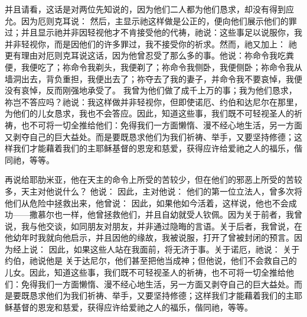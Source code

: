 并且请看，这话是对两位先知说的，因为他们二人都为他们恳求，却没有得到应允。因为厄则克耳说： 然后，主显示祂这样做是公正的，便向他们展示他们的罪过；并且显示祂并非因轻视他才不肯接受他的代祷，祂说：这些事足以说服你，我并非轻视你，而是因他们的许多罪过，我不接受你的祈求。然而，祂又加上： 祂更有理由对厄则克耳说这话，因为他曾忍受了那么多的事。他说：祢命令我吃粪便，我便吃了；祢命令我剃头，我便剃了；祢命令我侧卧，我便侧卧；祢命令我从墙洞出去，背负重担，我便出去了；祢夺去了我的妻子，并命令我不要哀悼，我便没有哀悼，反而刚强地承受了。 我曾为他们做了成千上万的事；我为他们恳求，祢岂不答应吗？祂说：我这样做并非轻视你，但即使诺厄、约伯和达尼尔在那里，为他们的儿女恳求，我也不会答应。因此，知道这些事，我们既不可轻视圣人的祈祷，也不可将一切全推给他们：免得我们一方面懒惰、漫不经心地生活，另一方面又剥夺自己的巨大益处。而是要既恳求他们为我们祈祷、举手，又要坚持修德；这样我们才能藉着我们的主耶稣基督的恩宠和慈爱，获得应许给爱祂之人的福乐，偕同祂，等等。\par

再说给耶肋米亚，他在天主的命令上所受的苦较少，但在他们的邪恶上所受的苦较多，天主对他说什么？ 他说： 因此，主对他说： 他们的第一位立法人，曾多次将他们从危险中拯救出来，他曾说： 因此，如果他如今活着，这样说，他也不会成功——撒慕尔也一样，他曾拯救他们，并且自幼就受人钦佩。因为关于前者，我曾说，我与他交谈，如同朋友对朋友，并非通过隐晦的言语。关于后者，我曾说，在他幼年时我就向他启示，并且因他的缘故，我被说服，打开了曾被封闭的预言。因为经上说： 因此，如果这些人站在我面前，将无济于事。关于诺厄，祂说： 关于约伯，祂说他是 关于达尼尔，他们甚至把他当成神；但他说，他们不会救自己的儿女。因此，知道这些事，我们既不可轻视圣人的祈祷，也不可将一切全推给他们：免得我们一方面懒惰、漫不经心地生活，另一方面又剥夺自己的巨大益处。而是要既恳求他们为我们祈祷、举手，又要坚持修德；这样我们才能藉着我们的主耶稣基督的恩宠和慈爱，获得应许给爱祂之人的福乐，偕同祂，等等。\par


